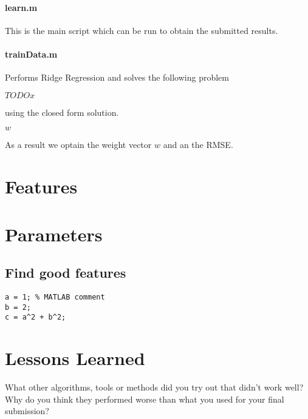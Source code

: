 \documentclass[a4paper, 11pt]{article}
\begin{document}
\paragraph{learn.m}
This is the main script which can be run to obtain the submitted results.
\paragraph{trainData.m}
Performs Ridge Regression and solves the following problem

$ TODOx$

using the closed form solution.


$ w$

As a result we optain the weight vector $w$ and an the RMSE.



\section{Features}

\section{Parameters}

\subsection{Find good features}

\begin{lstlisting} 
a = 1; % MATLAB comment 
b = 2; 
c = a^2 + b^2; 

\end{lstlisting}


\section{Lessons Learned} What other algorithms, tools or methods did you try out that didn't work well?
Why do you think they performed worse than what you used for your final submission?
\end{document}
